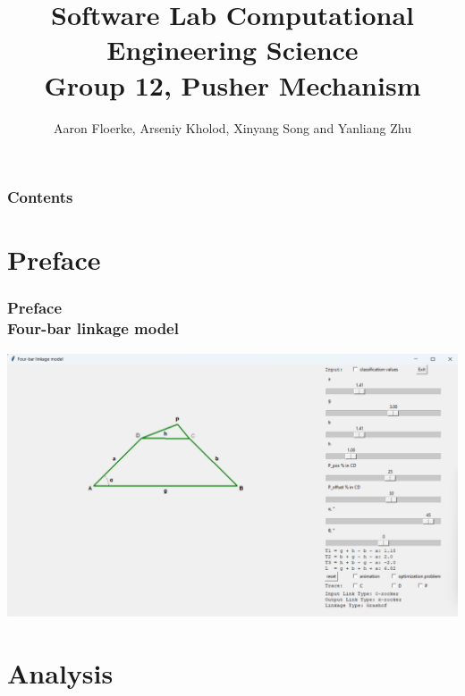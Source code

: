 \documentclass[ucs,10pt]{beamer}
\begin{document}
\title[{\tt info@stce.rwth-aachen.de}]{\textcolor{rwth-blue}{Software Lab Computational Engineering Science} \vspace{.2cm} \\ {\small Group 12, Pusher Mechanism}}
\author[Group 12, Pusher Mechanism]{Aaron Floerke, Arseniy Kholod, Xinyang Song and Yanliang Zhu} 
\date[]{}

\begin{frame}[plain]
\titlepage
\end{frame}

\begin{frame}
	\frametitle{Contents}
	\vspace*{2mm}
	\tableofcontents
\end{frame}

\section{Preface}

\begin{frame}
\frametitle{Preface \\
	\small \color{rwth-blue} Four-bar linkage model}
	\begin{center}
		\includegraphics[width=\linewidth]{./Figures/GUI_screen.png}
	\end{center}
\end{frame}

\section{Analysis}
\end{document}
